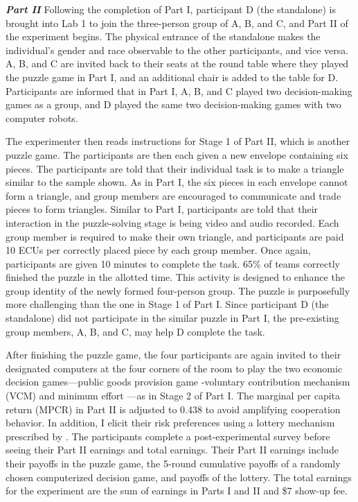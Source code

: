 \noindent \textbf{ \textit{Part II}}
\newline
Following the completion of Part I, participant D (the standalone) is brought into Lab 1 to join the three-person group of A, B, and C, and Part II of the experiment begins. The physical entrance of the standalone makes the individual's gender and race observable to the other participants, and vice versa. A, B, and C are invited back to their seats at the round table where they played the puzzle game in Part I, and an additional chair is added to the table for D. Participants are informed that in Part I, A, B, and C played two decision-making games as a group, and D played the same two decision-making games with two computer robots. 
  
The experimenter then reads instructions for Stage 1 of Part II, which is another puzzle game. The participants are then each given a new envelope containing six pieces. The participants are told that their individual task is to make a triangle similar to the sample shown. As in Part I, the six pieces in each envelope cannot form a triangle, and group members are encouraged to communicate and trade pieces to form triangles. Similar to Part I, participants are told that their interaction in the puzzle-solving stage is being video and audio recorded. Each group member is required to make their own triangle, and participants are paid 10 ECUs per correctly placed piece by each group member.  Once again, participants are given 10 minutes to complete the task. 65\% of teams correctly finished the puzzle in the allotted time. This activity is designed to enhance the group identity of the newly formed four-person group. The puzzle is purposefully more challenging than the one in Stage 1 of Part I. Since participant D (the standalone) did not participate in the similar puzzle in Part I, the pre-existing group members, A, B, and C, may help D complete the task.

 \hspace  *{0mm} After finishing the puzzle game, the four participants are again invited to their designated computers at the four corners of the room to play the two economic decision games—public goods provision game -voluntary contribution mechanism (VCM) and minimum effort —as in Stage 2 of Part I. The marginal per capita return (MPCR) in Part II is adjusted to 0.438 to avoid amplifying cooperation behavior. In addition, I elicit their risk preferences using a lottery mechanism prescribed by \cite{eg02}. The participants complete a post-experimental survey before seeing their Part II earnings and total earnings. Their Part II earnings include their payoffs in the puzzle game, the 5-round cumulative payoffs of a randomly chosen computerized decision game, and payoffs of the lottery. The total earnings for the experiment are the sum of earnings in Parts I and II and \$7 show-up fee.

